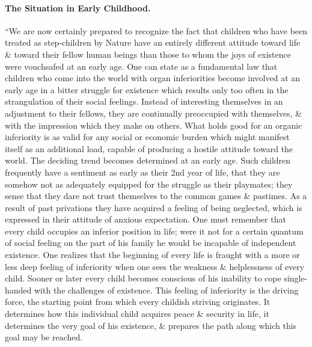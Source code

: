 \documentclass{article}
\begin{document}
\paragraph{The Situation in Early Childhood.} ``We are now certainly prepared to recognize the fact that children who have been treated as step-children by Nature have an entirely different attitude toward life \& toward their fellow human beings than those to whom the joys of existence were vouchsafed at an early age. One can state as a fundamental law that children who come into the world with organ inferiorities become involved at an early age in a bitter struggle for existence which results only too often in the strangulation of their social feelings. Instead of interesting themselves in an adjustment to their fellows, they are continually preoccupied with themselves, \& with the impression which they make on others. What holds good for an organic inferiority is as valid for any social or economic burden which might manifest itself as an additional load, capable of producing a hostile attitude toward the world. The deciding trend becomes determined at an early age. Such children frequently have a sentiment as early as their 2nd year of life, that they are somehow not as adequately equipped for the struggle as their playmates; they sense that they dare not trust themselves to the common games \& pastimes. As a result of past privations they have acquired a feeling of being neglected, which is expressed in their attitude of anxious expectation. One must remember that every child occupies an inferior position in life; were it not for a certain quantum of social feeling on the part of his family he would be incapable of independent existence. One realizes that the beginning of every life is fraught with a more or less deep feeling of inferiority when one sees the weakness \& helplessness of every child. Sooner or later every child becomes conscious of his inability to cope single-handed with the challenges of existence. This feeling of inferiority is the driving force, the starting point from which every childish striving originates. It determines how this individual child acquires peace \& security in life, it determines the very goal of his existence, \& prepares the path along which this goal may be reached.
\end{document}
